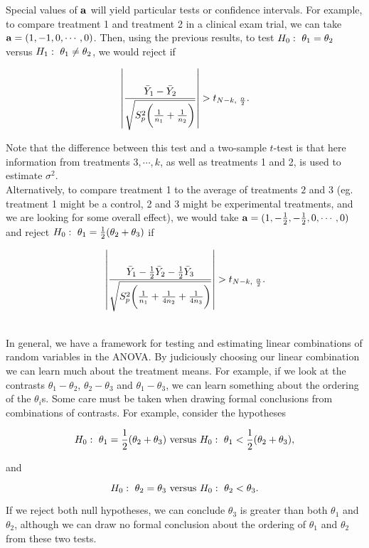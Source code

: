 \documentclass{homework}
\begin{document}
\begin{tcolorbox}[title=Example of ANOVA contrasts]

Special values of ${\bf a}$ will yield particular tests or confidence intervals. For example, to compare treatment 1 and treatment 2 in a clinical exam trial, we can take ${\bf a} = (1, -1, 0, \cdots, 0)$. Then, using the previous results, to test $H_0: \textnormal{ } \theta_1=\theta_2$ versus $H_1: \textnormal{ } \theta_1 \neq \theta_2$, we would reject if 

$$
\left|{\frac{\bar{Y}_1 - \bar{Y}_2}{{\sqrt{S_p^2 \bigg(\frac{1}{n_1}+\frac{1}{n_2}\bigg)}}}}\right| > t_{N-k, \textnormal{ } \frac{\alpha}{2}}.
$$

Note that the difference between this test and a two-sample $t$-test is that here information from treatments $3,\cdots,k$, as well as treatments 1 and 2, is used to estimate $\sigma^2$. \\

Alternatively, to compare treatment 1 to the average of treatments $2$ and 3 (eg. treatment 1 might be a control, 2 and 3 might be experimental treatments, and we are looking for some overall effect), we would take ${\bf a} = (1, -\frac{1}{2}, -\frac{1}{2}, 0, \cdots, 0)$ and reject $H_0: \textnormal{ } \theta_1 = \frac{1}{2}(\theta_2+\theta_3)$ if 

$$
\left|{\frac{\bar{Y}_1 - \frac{1}{2} \bar{Y}_2 - \frac{1}{2} \bar{Y}_3}{{\sqrt{S_p^2 \bigg(\frac{1}{n_1}+\frac{1}{4n_2}+\frac{1}{4n_3}\bigg)}}}}\right| > t_{N-k, \textnormal{ } \frac{\alpha}{2}}.
$$

\blank \\

In general, we have a framework for testing and estimating linear combinations of random variables in the ANOVA. By judiciously choosing our linear combination we can learn much about the treatment means. For example, if we look at the contrasts $\theta_1-\theta_2$, $\theta_2-\theta_3$ and $\theta_1-\theta_3$, we can learn something about the ordering of the $\theta_i$s. Some care must be taken when drawing formal conclusions from combinations of contrasts. For example, consider the hypotheses 

$$
H_0: \textnormal{ } \theta_{1} = \frac{1}{2}(\theta_{2}+\theta_{3}) \textnormal{ versus } H_0: \textnormal{ } \theta_{1} < \frac{1}{2}(\theta_{2}+\theta_{3}),
$$

and 

$$
H_0 : \textnormal{ } \theta_2 = \theta_3 \textnormal{ versus } H_0 : \textnormal{ } \theta_2 < \theta_3.
$$

If we reject both null hypotheses, we can conclude $\theta_3$ is greater than both $\theta_1$ and $\theta_2$, although we can draw no formal conclusion about the ordering of $\theta_1$ and $\theta_2$ from these two tests. 
\end{tcolorbox}
\end{document}
